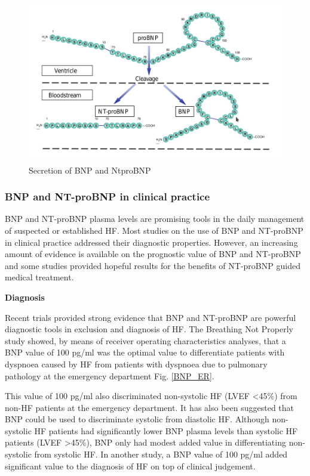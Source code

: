 \documentclass[14pt,a4paper,onecolumn]{extarticle}
\begin{document}
\begin{figure}
    \centering
    \includegraphics[scale=0.4]{../images/BNP_secretion.png}
    \small\caption{Secretion of BNP and NtproBNP}
    \label{BNP_secretion}
\end{figure}

\subsubsection{BNP and NT-proBNP in clinical practice}
BNP and NT-proBNP plasma levels are promising tools in the daily management of suspected or established HF. Most studies on the use of BNP and NT-proBNP in clinical practice addressed their diagnostic properties. However, an increasing amount of evidence is available on the prognostic value of BNP and NT-proBNP and some studies provided hopeful results for the benefits of NT-proBNP guided medical treatment.

\textbf{Diagnosis}

Recent trials provided strong evidence that BNP and NT-proBNP are powerful diagnostic tools in exclusion and diagnosis of HF. The Breathing Not Properly study showed, by means of receiver operating characteristics analyses, that a BNP value of 100 pg/ml was the optimal value to differentiate patients with dyspnoea caused by HF from patients with dyspnoea due to pulmonary pathology at the emergency department Fig. \ref{BNP_ER}. \citep{Maisel2002}

This value of 100 pg/ml also discriminated non-systolic HF (LVEF <45\%) from non-HF patients at the emergency department. It has also been suggested that BNP could be used to discriminate systolic from diastolic HF. Although non-systolic HF patients had significantly lower BNP plasma levels than systolic HF patients (LVEF >45\%), BNP only had modest added value in differentiating non-systolic from systolic HF. In another study, a BNP value of 100 pg/ml added significant value to the diagnosis of HF on top of clinical judgement. \citep{McCullough2002}
\end{document}
